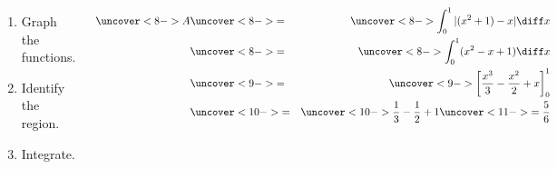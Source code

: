 \begin{frame}
\begin{example}[Example 1, p. 348]
\begin{columns}
{}%
%  

\begin{enumerate}
\item<2->  Graph the functions.
\item<5->  Identify the region.
\item<7->  Integrate.
\end{enumerate}
\begin{eqnarray*}
\uncover<8->{A} & \uncover<8->{=} & \uncover<8->{\int_0^1 |(x^2 + 1) - x|\diff x} \\
 &  \uncover<8->{=} & \uncover<8->{\int_0^1 ( x^2 - x + 1 ) \diff x} \\
 & \uncover<9->{=} & \uncover<9->{\left[  \frac{x^3}{3} - \frac{x^2}{2} + x \right]_0^1} \\
 & \uncover<10->{=} & \uncover<10->{ \frac{1}{3} - \frac{1}{2} + 1 } \uncover<11->{  = \frac{5}{6} } 
\end{eqnarray*}
\end{columns}
\end{example}
\end{frame}
